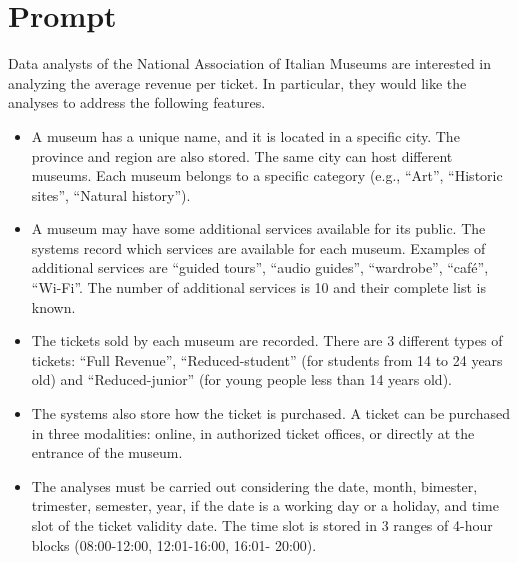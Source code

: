\section{Prompt}
Data analysts of the National Association of Italian Museums are interested in analyzing the
average revenue per ticket. In particular, they would like the analyses to address the following features.
\begin{itemize}
\item 
A museum has a unique name, and it is located in a specific city. The province and region
are also stored. The same city can host different museums. Each museum belongs to a
specific category (e.g., “Art”, “Historic sites”, “Natural history”).
\item
A museum may have some additional services available for its public. The systems record
which services are available for each museum. Examples of additional services are “guided
tours”, “audio guides”, “wardrobe”, “café”, “Wi-Fi”. The number of additional services is 10
and their complete list is known.
\item
The tickets sold by each museum are recorded. There are 3 different types of tickets: “Full
Revenue”, “Reduced-student” (for students from 14 to 24 years old) and “Reduced-junior”
(for young people less than 14 years old).
\item
The systems also store how the ticket is purchased. A ticket can be purchased in three
modalities: online, in authorized ticket offices, or directly at the entrance of the museum.
\item
The analyses must be carried out considering the date, month, bimester, trimester,
semester, year, if the date is a working day or a holiday, and time slot of the ticket validity
date. The time slot is stored in 3 ranges of 4-hour blocks (08:00-12:00, 12:01-16:00, 16:01-
20:00). 
\end{itemize}



